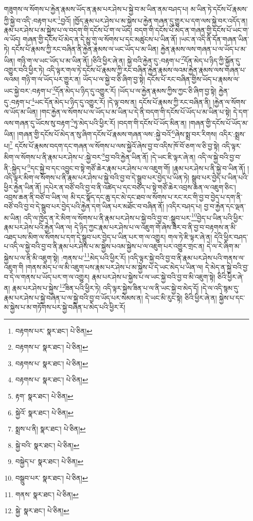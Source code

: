 གཟུགས་ལ་སོགས་པ་རྐྱེན་རྣམས་ཡོད་ན་རྣམ་པར་ཤེས་པ་སྐྱེ་བ་མ་ཡིན་ནམ་བཤད་པ། མ་ཡིན་ཏེ་དངོས་པོ་རྣམས་ཀྱི་སྐྱེ་བ་འདི་:བརྟག་པར་\footnote{བརྟགས་པར་  སྣར་ཐང་།  པེ་ཅིན། }བྱའོ། །ཁྱོད་རྣམ་པར་ཤེས་པ་མ་སྐྱེས་པ་རྐྱེན་གཞན་དུ་གྱུར་པ་དག་ལས་སྐྱེ་བར་འདོད་ན། རྣམ་པར་ཤེས་པ་མ་སྐྱེས་པ་ལ་བདག་གི་དངོས་པོ་ག་ལ་ཡོད། བདག་གི་དངོས་པོ་མེད་ན་གཞན་གྱི་དངོས་པོ་ཡང་ག་ལ་ཡོད། གཞན་གྱི་དངོས་པོ་མེད་ན་དེ་མྱུ་གུ་ལ་སོགས་པ་དང་མཚུངས་པ་ཡིན་ནོ། །ཡང་ན་འདི་ནི་དོན་གཞན་ཡིན་ཏེ། དངོས་པོ་རྣམས་ཀྱི་རང་བཞིན་ནི་རྐྱེན་རྣམས་ལ་ཡང་ཡོད་པ་མ་ཡིན། རྐྱེན་རྣམས་ལས་གཞན་པ་ལ་ཡོད་པ་མ་ཡིན། གཉི་ག་ལ་ཡང་ཡོད་པ་མ་ཡིན་ནོ། །ཅིའི་ཕྱིར་ཞེ་ན། སྐྱེ་བའི་རྐྱེན་དུ་:བརྟག་པ་\footnote{བརྟགས་པ་  སྣར་ཐང་།  པེ་ཅིན། }དོན་མེད་པ་ཉིད་ཀྱི་སྐྱོན་དུ་འགྱུར་བའི་ཕྱིར་ཏེ། འདི་ལྟར་གལ་ཏེ་དངོས་པོ་རྣམས་ཀྱི་རང་བཞིན་རྐྱེན་རྣམས་ལའམ་རྐྱེན་རྣམས་ལས་གཞན་པ་ལའམ། གཉི་ག་ལ་ཡོད་པར་གྱུར་ན། ཡོད་པ་ལ་སྐྱེ་བ་ཅི་ཞིག་བྱ་སྟེ། དངོས་པོ་རང་བཞིན་གྱིས་ཡོད་པ་རྣམས་ལ་ཡང་སྐྱེ་བར་:བརྟག་པ་\footnote{བརྟགས་པ་  སྣར་ཐང་།  པེ་ཅིན། }དོན་མེད་པ་ཉིད་དུ་འགྱུར་རོ། །ཡོད་པ་ལ་རྐྱེན་རྣམས་ཀྱིས་ཀྱང་ཅི་ཞིག་བྱ་སྟེ། རྐྱེན་དུ་:བརྟག་པ་\footnote{བརྟགས་པ་  སྣར་ཐང་།  པེ་ཅིན། }ཡང་དོན་མེད་པ་ཉིད་དུ་འགྱུར་རོ། །དེ་ལྟ་བས་ན། དངོས་པོ་རྣམས་ཀྱི་རང་བཞིན་ནི། །རྐྱེན་ལ་སོགས་ལ་ཡོད་མ་ཡིན། །གང་རྐྱེན་ལ་སོགས་པ་ལ་ཡོད་པ་མ་ཡིན་པ་དེ་ནི་བདག་གི་དངོས་པོ་ཡོད་པ་མ་ཡིན་པ་སྟེ། དེ་དག་ལས་གཞན་དུ་ཡོངས་སུ་བརྟག་\footnote{རྟག་  སྣར་ཐང་།  པེ་ཅིན། }ཏུ་མེད་པའི་ཕྱིར་རོ། །བདག་གི་དངོས་པོ་ཡོད་མིན་ན། །གཞན་གྱི་དངོས་པོ་ཡོད་མ་ཡིན། །གཞན་གྱི་དངོས་པོ་མེད་ན་སུ་ཞིག་དངོས་པོ་རྣམས་གཞན་ལས་:སྐྱེ་བའོ་\footnote{སྐྱེའོ་  སྣར་ཐང་།  པེ་ཅིན། }ཞེས་སྨྲ་བར་རིགས། འདིར་:སྨྲས་པ།\footnote{སྨྲས་པ་ནི།  སྣར་ཐང་།  པེ་ཅིན། } དངོས་པོ་རྣམས་བདག་དང་གཞན་ལ་སོགས་པ་ལས་སྐྱེའོ་ཞེས་བྱ་བ་འདིས་ཁོ་བོ་ཅག་ལ་ཅི་བྱ་སྟེ། འདི་ལྟར་མིག་ལ་སོགས་པ་ནི་རྣམ་པར་ཤེས་པ་:སྐྱེ་བར་\footnote{སྐྱེ་བའི་  སྣར་ཐང་།  པེ་ཅིན། }བྱ་བའི་རྐྱེན་ཡིན་ནོ། །དེ་ཡང་ཇི་ལྟར་ཞེ་ན། འདི་ལ་སྐྱེ་བའི་བྱ་བ་ནི་:སྐྱེད་པ་\footnote{བསྐྱེད་པ་  སྣར་ཐང་།  པེ་ཅིན། }དང་སྐྱེ་བ་དང་འབྱུང་བ་སྟེ་གཙོ་ཆེར་རྣམ་པར་ཤེས་པ་ལ་འཇུག་གོ། །རྣམ་པར་ཤེས་པ་ནི་སྐྱེ་བ་ཡིན་ནོ། །འདི་ལྟར་མིག་ལ་སོགས་པ་ནི་རྣམ་པར་ཤེས་པ་སྐྱེ་བའི་བྱ་བ་དེ་སྒྲུབ་པར་བྱེད་པ་ཡིན་ཏེ། སྒྲུབ་པར་བྱེད་པ་ཡིན་པའི་ཕྱིར་རྐྱེན་ཡིན་ནོ། །དཔེར་ན་བཙོ་བའི་བྱ་བ་ནི་འཚེད་པ་དང་བཙེད་པ་སྟེ་གཙོ་ཆེར་འབྲས་ཆན་ལ་འཇུག་ཅིང་། འབྲས་ཆན་ནི་བཙོ་བ་ཡིན་ལ། མི་དང་སྣོད་དང་ཆུ་དང་མེ་དང་ཐབ་ལ་སོགས་པ་རང་རང་གི་བྱ་བ་བྱེད་པ་དག་ནི་བཙོ་བའི་བྱ་བ་དེ་སྒྲུབ་པར་བྱེད་པའི་རྐྱེན་དག་ཡིན་པར་མཐོང་བ་བཞིན་ནོ། །འདིར་བཤད་པ། བྱ་བ་རྐྱེན་དང་ལྡན་མ་ཡིན། འདི་ལ་ཁྱེད་ན་རེ་མིག་ལ་སོགས་པ་ནི་རྣམ་པར་ཤེས་པ་སྐྱེ་བའི་བྱ་བ་:སྒྲུབ་པར་\footnote{བསྒྲུབ་པར་  སྣར་ཐང་།  པེ་ཅིན། }བྱེད་པ་ཡིན་པའི་ཕྱིར་རྣམ་པར་ཤེས་པའི་རྐྱེན་ཡིན་ལ། དེ་ཉིད་ཀྱང་རྣམ་པར་ཤེས་པ་ལ་འཇུག་གོ་ཞེས་ཟེར་བ་ནི་བྱ་བ་བརྟགས་ན་མི་འཐད་པས་མིག་ལ་སོགས་པ་དག་དེ་སྒྲུབ་པར་བྱེད་པ་ཡིན་པར་ག་ལ་འགྱུར། གལ་ཏེ་ཇི་ལྟར་ཞེ་ན། དེའི་ཕྱིར་བཤད་པ་འདི་ལ་སྐྱེ་བའི་བྱ་བ་ནི་རྣམ་པར་ཤེས་པ་མ་སྐྱེས་པའམ་སྐྱེས་པ་ལ་འཇུག་པར་འགྱུར་གྲང་ན། དེ་ལ་རེ་ཞིག་མ་སྐྱེས་པ་ལ་ནི་མི་འཇུག་སྟེ། :གནས་པ་\footnote{གནས་  སྣར་ཐང་།  པེ་ཅིན། }མེད་པའི་ཕྱིར་རོ། །འདི་ལྟར་སྐྱེ་བའི་བྱ་བ་ནི་རྣམ་པར་ཤེས་པའི་གནས་ལ་འཇུག་གི །གནས་མེད་པ་ལ་མི་འཇུག་པས་རྣམ་པར་ཤེས་པ་མ་སྐྱེས་པ་དེ་ཡང་མེད་པ་ཡིན་ལ། དེ་མེད་ན་སྐྱེ་བའི་བྱ་བ་དེ་ལ་གནས་པ་ཡོད་པར་ག་ལ་འགྱུར། རྣམ་པར་ཤེས་པ་སྐྱེས་པ་ལ་ཡང་སྐྱེ་བའི་བྱ་བ་མི་འཇུག་སྟེ། ཅིའི་ཕྱིར་ཞེ་ན། རྣམ་པར་ཤེས་པ་སྐྱེས་\footnote{སྐྱེ་  སྣར་ཐང་།  པེ་ཅིན། }ཟིན་པའི་ཕྱིར་ཏེ། འདི་ལྟར་སྐྱེས་ཟིན་པ་ལ་ནི་ཡང་སྐྱེ་བ་མེད་དོ། །དེ་ལ་འདི་སྙམ་དུ་རྣམ་པར་ཤེས་པ་སྐྱེ་བཞིན་པ་ལ་སྐྱེ་བའི་བྱ་བ་ཡོད་པར་སེམས་ན། དེ་ཡང་མི་རུང་སྟེ། ཅིའི་ཕྱིར་ཞེ་ན། སྐྱེས་པ་དང་མ་སྐྱེས་པ་མ་གཏོགས་པར་སྐྱེ་བཞིན་པ་མེད་པའི་ཕྱིར་རོ། 